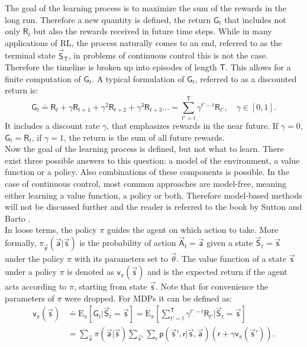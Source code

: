 The goal of the learning process is to maximize the sum of the rewards in the long run. Therefore a new quantity is defined, the return $\mathsf{G}_t$ that includes not only $\mathsf{R}_t$ but also the rewards received in future time steps. While in many applications of RL, the process naturally comes to an end, referred to as the terminal state $\vec{\mathsf{S}}_\mathsf{T}$, in problems of continuous control this is not the case. Therefore the timeline is broken up into episodes of length $\mathsf{T}$. This allows for a finite computation of $\mathsf{G}_t$. A typical formulation of $\mathsf{G}_t$, referred to as a discounted return is:
\begin{equation}
\mathsf{G}_t \doteq \mathsf{R}_t + \gamma \mathsf{R}_{t+1} + \gamma^2 \mathsf{R}_{t+2} + \gamma^3 \mathsf{R}_{t+3}... = \sum_{t'=t}^{\mathsf{T}}\gamma^{t'-t} \mathsf{R}_{t'},\quad \gamma \in [0, 1]. \label{eq:return}
\end{equation}
It includes a discount rate $\gamma$, that emphasizes rewards in the near future. If $\gamma = 0$, $\mathsf{G}_t = \mathsf{R}_t$, if $\gamma = 1$, the return is the sum of all future rewards. \cite[p. 47- 57]{sutton_reinforcement_2018} \\
Now the goal of the learning process is defined, but not what to learn. There exist three possible answers to this question: a model of the environment, a value function or a policy. Also combinations of these components is possible. In the case of continuous control, most common approaches are model-free, meaning either learning a value function, a policy or both. Therefore model-based methods will not be discussed further and the reader is referred to the book by Sutton and Barto \cite{sutton_reinforcement_2018}. \\
In loose terms, the policy $\pi$ guides the agent on which action to take. More formally, $\pi_{\vec{\theta}}(\vec{\mathsf{a}}|\vec{\mathsf{s}})$ is the probability of action $\vec{\mathsf{A}}_t=\vec{\mathsf{a}}$ given a state $\vec{\mathsf{S}}_t=\vec{\mathsf{s}}$ under the policy $\pi$ with its parameters set to $\vec{\theta}$. The value function of a state $\vec{\mathsf{s}}$ under a policy $\pi$ is denoted as $\mathsf{v}_{\pi}(\vec{\mathsf{s}})$ and is the expected return if the agent acts according to $\pi$, starting from state $\vec{\mathsf{s}}$. Note that for convenience the parameters of $\pi$ were dropped. For MDPs it can be defined as: 
\begin{align}
	\mathsf{v}_{\pi}(\vec{\mathsf{s}}) &\doteq \mathrm{E}_\pi \left[ \mathsf{G}_t \vert \vec{\mathsf{S}}_t= \vec{\mathsf{s}} \right] =
	\mathrm{E}_\pi \left[\sum_{t'=t}^{\mathsf{T}}\gamma^{t'-t} \mathsf{R}_{t'} \vert \vec{\mathsf{S}}_t=\vec{\mathsf{s}}\right] \label{eq:value_func} \\
	&= \sum_{\vec{\mathsf{a}}} \pi(\vec{\mathsf{a}} \vert \vec{\mathsf{s}}) 
	\sum_{\vec{\mathsf{s}}'} \sum_{\mathsf{r}} \mathsf{p}(\vec{\mathsf{s}}',\mathsf{r} \vert \vec{\mathsf{s}},\vec{\mathsf{a}}) \left( \mathsf{r} + \gamma \mathsf{v}_\pi(\vec{\mathsf{s}}') \right). \label{eq:Bellmann}
\end{align}
